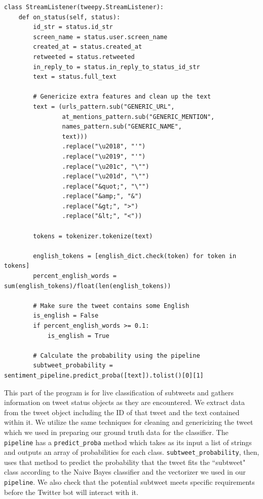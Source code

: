 \documentclass[11pt, twoside, reqno]{book}
\begin{document}
\begin{verbatim}
class StreamListener(tweepy.StreamListener):
    def on_status(self, status):
        id_str = status.id_str
        screen_name = status.user.screen_name
        created_at = status.created_at
        retweeted = status.retweeted
        in_reply_to = status.in_reply_to_status_id_str
        text = status.full_text
        
        # Genericize extra features and clean up the text
        text = (urls_pattern.sub("GENERIC_URL", 
                at_mentions_pattern.sub("GENERIC_MENTION", 
                names_pattern.sub("GENERIC_NAME",
                text)))
                .replace("\u2018", "'")
                .replace("\u2019", "'")
                .replace("\u201c", "\"")
                .replace("\u201d", "\"")
                .replace("&quot;", "\"")
                .replace("&amp;", "&")
                .replace("&gt;", ">")
                .replace("&lt;", "<"))
        
        tokens = tokenizer.tokenize(text)
        
        english_tokens = [english_dict.check(token) for token in tokens]
        percent_english_words = sum(english_tokens)/float(len(english_tokens))
        
        # Make sure the tweet contains some English
        is_english = False
        if percent_english_words >= 0.1:
            is_english = True
        
        # Calculate the probability using the pipeline
        subtweet_probability = sentiment_pipeline.predict_proba([text]).tolist()[0][1]
\end{verbatim}

\noindent
This part of the program is for live classification of subtweets and gathers information on tweet status objects as they are encountered. We extract data from the tweet object including the ID of that tweet and the text contained within it. We utilize the same techniques for cleaning and genericizing the tweet which we used in preparing our ground truth data for the classifier. The \verb|pipeline| has a \verb|predict_proba| method which takes as its input a list of strings and outputs an array of probabilities for each class. \verb|subtweet_probability|, then, uses that method to predict the probability that the tweet fits the ``subtweet" class according to the Naive Bayes classifier and the vectorizer we used in our \verb|pipeline|. We also check that the potential subtweet meets specific requirements before the Twitter bot will interact with it.
\end{document}
